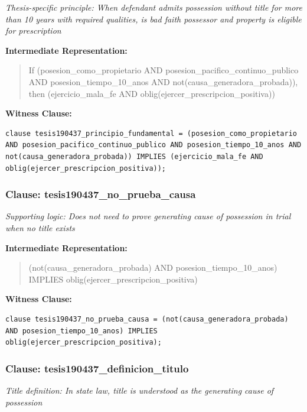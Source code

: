 \documentclass[11pt,a4paper]{article}
\begin{document}
\textit{Thesis-specific principle: When defendant admits possession without title for more than 10 years with required qualities, is bad faith possessor and property is eligible for prescription}

\textbf{Intermediate Representation:}

\begin{quote}
If (posesion\_como\_propietario AND posesion\_pacifico\_continuo\_publico AND posesion\_tiempo\_10\_anos AND not(causa\_generadora\_probada)), then (ejercicio\_mala\_fe AND oblig(ejercer\_prescripcion\_positiva))
\end{quote}

\textbf{Witness Clause:}

\begin{lstlisting}[style=witnessstyle, language=Witness]
clause tesis190437_principio_fundamental = (posesion_como_propietario AND posesion_pacifico_continuo_publico AND posesion_tiempo_10_anos AND not(causa_generadora_probada)) IMPLIES (ejercicio_mala_fe AND oblig(ejercer_prescripcion_positiva));
\end{lstlisting}

\subsubsection{Clause: tesis190437\_no\_prueba\_causa}

\textit{Supporting logic: Does not need to prove generating cause of possession in trial when no title exists}

\textbf{Intermediate Representation:}

\begin{quote}
(not(causa\_generadora\_probada) AND posesion\_tiempo\_10\_anos) IMPLIES oblig(ejercer\_prescripcion\_positiva)
\end{quote}

\textbf{Witness Clause:}

\begin{lstlisting}[style=witnessstyle, language=Witness]
clause tesis190437_no_prueba_causa = (not(causa_generadora_probada) AND posesion_tiempo_10_anos) IMPLIES oblig(ejercer_prescripcion_positiva);
\end{lstlisting}

\subsubsection{Clause: tesis190437\_definicion\_titulo}

\textit{Title definition: In state law, title is understood as the generating cause of possession}
\end{document}
